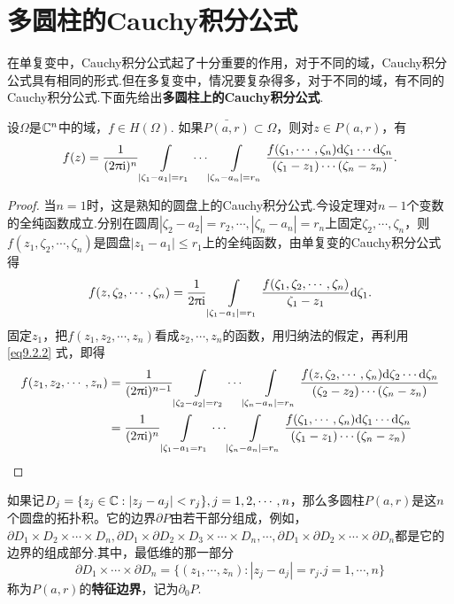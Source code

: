 \section{多圆柱的Cauchy积分公式\label{sec9.2}}
在单复变中，Cauchy积分公式起了十分重要的作用，对于不同的域，Cauchy积分公式具有相同的形式.但在多复变中，情况要复杂得多，对于不同的域，有不同的Cauchy积分公式.下面先给出\textbf{多圆柱上的Cauchy积分公式}.
\begin{theorem}\label{thm9.2.1}
设$\Omega$是$\mathbb C^n$中的域，$f\in H(\Omega)$. 如果$\bar{P(a,r)}\subset \Omega$，则对$z\in P(a,r)$，有
\begin{equation}\label{eq9.2.1}
f(z)=\frac1{(2\uppi\textrm i)^n}\int\limits_{|\zeta_1-a_1|=r_1}\cdots\int\limits_{|\zeta_n-a_n|=r_n}
\frac{f(\zeta_1,\cdots,\zeta_n)\textrm d\zeta_1\cdots\textrm d\zeta_n}{(\zeta_1-z_1)\cdots(\zeta_n-z_n)}.
\end{equation}
\end{theorem}
\begin{proof}
当$n=1$时，这是熟知的圆盘上的Cauchy积分公式.今设定理对$n-1$个变数的全纯函数成立.分别在圆周$|\zeta_2-a_2|=r_2,\cdots,|\zeta_n-a_n|=r_n$上固定$\zeta_2,\cdots,\zeta_n$，则$f(z_1,\zeta_2,\cdots,\zeta_n)$是圆盘$|z_1-a_1|\le r_1$上的全纯函数，由单复变的Cauchy积分公式得
\begin{equation}\label{eq9.2.2}
f(z,\zeta_2,\cdots,\zeta_n)=\frac1{2\uppi\textrm i}\int\limits_{|\zeta_1-a_1|=r_1}
\frac{f(\zeta_1,\zeta_2,\cdots,\zeta_n)}{\zeta_1-z_1}\textrm d\zeta_1.
\end{equation}
固定$z_1$，把$f(z_1,z_2,\cdots,z_n)$看成$z_2,\cdots,z_n$的函数，用归纳法的假定，再利用 \eqref{eq9.2.2} 式，即得
\begin{align*}
f(z_1,z_2,\cdots,z_n)&=\frac1{(2\uppi\textrm i)^{n-1}}\int\limits_{|\zeta_2-a_2|=r_2}\cdots\int\limits_{|\zeta_n-a_n|=r_n}
\frac{f(z,\zeta_2,\cdots,\zeta_n)\textrm d\zeta_2\cdots\textrm d\zeta_n}{(\zeta_2-z_2)\cdots(\zeta_n-z_n)}\\
&=\frac1{(2\uppi\textrm i)^n}\int\limits_{|\zeta_1-a_1=r_1}\cdots\int\limits_{|\zeta_n-a_n|=r_n}
\frac{f(\zeta_1,\cdots,\zeta_n)\textrm d\zeta_1\cdots\textrm d\zeta_n}{(\zeta_1-z_1)\cdots(\zeta_n-z_n)}
\end{align*}
\end{proof}

如果记$D_j=\{z_j\in\mathbb C:|z_j-a_j|<r_j\},j=1,2,\cdots,n$，那么多圆柱$P(a,r)$是这$n$个圆盘的拓扑积。它的边界$\partial P$由若干部分组成，例如，$\partial D_1\times D_2\times\cdots\times D_n,\partial D_1\times\partial D_2\times D_3\times\cdots\times D_n,\cdots,\partial D_1\times\partial D_2\times\cdots\times\partial D_n$都是它的边界的组成部分.其中，最低维的那一部分
\[\partial D_1\times\cdots\times\partial D_n=\{(z_1,\cdots,z_n):|z_j-a_j|=r_j.j=1,\cdots,n\}\]
称为$P(a,r)$的\textbf{特征边界}，记为$\partial_0P$.

